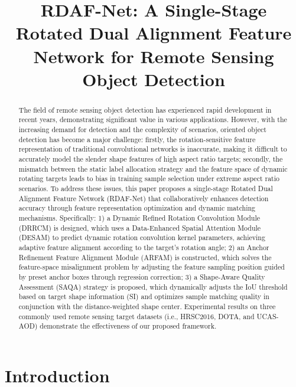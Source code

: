 \documentclass[10pt,twocolumn,final]{article}
\begin{document}
\title{RDAF-Net: A Single-Stage Rotated Dual Alignment Feature Network for Remote Sensing Object Detection}
\author{}
\maketitle

\begin{abstract}
The field of remote sensing object detection has experienced rapid development in recent years, demonstrating significant value in various applications. However, with the increasing demand for detection and the complexity of scenarios, oriented object detection has become a major challenge: firstly, the rotation-sensitive feature representation of traditional convolutional networks is inaccurate, making it difficult to accurately model the slender shape features of high aspect ratio targets; secondly, the mismatch between the static label allocation strategy and the feature space of dynamic rotating targets leads to bias in training sample selection under extreme aspect ratio scenarios. To address these issues, this paper proposes a single-stage Rotated Dual Alignment Feature Network (RDAF-Net) that collaboratively enhances detection accuracy through feature representation optimization and dynamic matching mechanisms. Specifically: 1) a Dynamic Refined Rotation Convolution Module (DRRCM) is designed, which uses a Data-Enhanced Spatial Attention Module (DESAM) to predict dynamic rotation convolution kernel parameters, achieving adaptive feature alignment according to the target's rotation angle; 2) an Anchor Refinement Feature Alignment Module (ARFAM) is constructed, which solves the feature-space misalignment problem by adjusting the feature sampling position guided by preset anchor boxes through regression correction; 3) a Shape-Aware Quality Assessment (SAQA) strategy is proposed, which dynamically adjusts the IoU threshold based on target shape information (SI) and optimizes sample matching quality in conjunction with the distance-weighted shape center. Experimental results on three commonly used remote sensing target datasets (i.e., HRSC2016, DOTA, and UCAS-AOD) demonstrate the effectiveness of our proposed framework.
\end{abstract}

\section{ Introduction }
\end{document}
